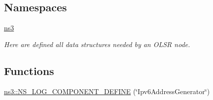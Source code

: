 \subsection*{Namespaces}
\begin{DoxyCompactItemize}
\item 
 \hyperlink{namespacens3}{ns3}
\begin{DoxyCompactList}\small\item\em Here are defined all data structures needed by an O\+L\+SR node. \end{DoxyCompactList}\end{DoxyCompactItemize}
\subsection*{Functions}
\begin{DoxyCompactItemize}
\item 
\hyperlink{namespacens3_ab3c14dc671a80db73c709d480955b563}{ns3\+::\+N\+S\+\_\+\+L\+O\+G\+\_\+\+C\+O\+M\+P\+O\+N\+E\+N\+T\+\_\+\+D\+E\+F\+I\+NE} (\char`\"{}Ipv6\+Address\+Generator\char`\"{})
\end{DoxyCompactItemize}
